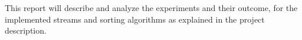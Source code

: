 This report will describe and analyze the experiments and their
outcome, for the implemented streams and sorting algorithms as
explained in the project description.
